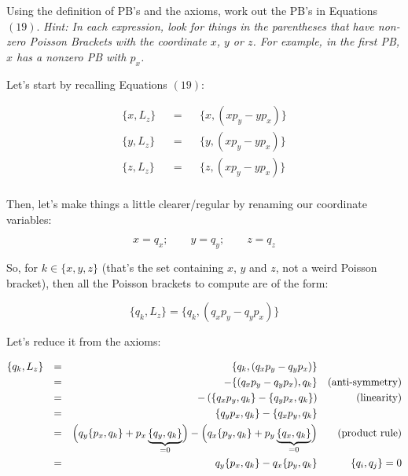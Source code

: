 \documentclass[solutions.tex]{subfiles}
\begin{document}
\maketitle
\begin{exercise}
Using the definition of PB's and the axioms, work out the PB's
in Equations $(19)$. \textit{Hint: In each expression, look for things
in the parentheses that have non-zero Poisson Brackets with the coordinate
$x$, $y$ or $z$. For example, in the first PB, $x$ has a nonzero PB with $p_x$.}
\end{exercise}

Let's start by recalling Equations $(19)$:

\begin{equation*}\begin{aligned}
	\{ x, L_z \} &&=&& \{ x, (xp_y - yp_x) \} \\
	\{ y, L_z \} &&=&& \{ y, (xp_y - yp_x) \} \\
	\{ z, L_z \} &&=&& \{ z, (xp_y - yp_x) \} \\
\end{aligned}\end{equation*}

Then, let's make things a little clearer/regular by renaming our
coordinate variables:

\[ x = q_x;\qquad y = q_y;\qquad z = q_z \]

So, for $k\in\{x, y, z\}$ (that's the set containing $x$, $y$ and $z$,
not a weird Poisson bracket), then all the Poisson brackets to compute are
of the form:

\[ \{ q_k, L_z \} = \{ q_k, (q_xp_y - q_yp_x) \} \]

Let's reduce it from the axioms:

\begin{equation*}\begin{aligned}
	\{ q_k, L_z \} &&=&& \{ q_k, (q_xp_y - q_yp_x) \} && ~ \\
	~ &&=&& - \{ (q_xp_y - q_yp_x), q_k \} && \text{(anti-symmetry)} \\
	~ &&=&& - \left(\{q_xp_y, q_k \} - \{ q_yp_x, q_k \}\right) && \text{(linearity)} \\
	~ &&=&& \{ q_yp_x, q_k \}-\{q_xp_y, q_k \} && ~ \\
	~ &&=&& \Bigl(q_y\{ p_x, q_k \} + p_x \underbrace{\{ q_y, q_k \}}_{=0}\Bigr)
		- \Bigl( q_x\{ p_y, q_k \} + p_y \underbrace{\{ q_x, q_k \}}_{=0}\Bigr)
		&& \text{(product rule)} \\
	~ &&=&& q_y\{ p_x, q_k \} - q_x\{ p_y, q_k \} && \{ q_i, q_j \} = 0
\end{aligned}\end{equation*}
\end{document}
